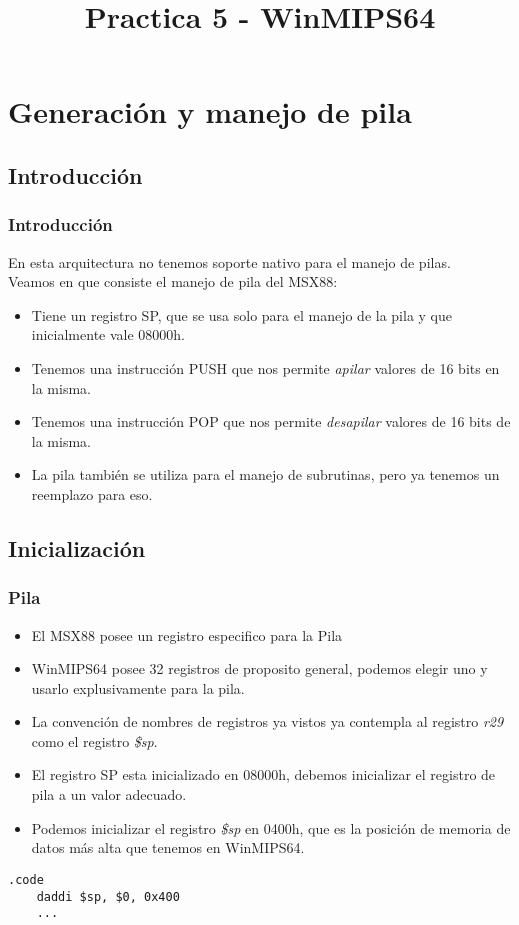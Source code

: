 \documentclass{beamer}
\title{Practica 5 - WinMIPS64}
\begin{document}
\section{Generación y manejo de pila}
\subsection{Introducción}
\begin{frame}
\frametitle{Introducción}
En esta arquitectura no tenemos soporte nativo para el manejo de pilas. \\
Veamos en que consiste el manejo de pila del MSX88:
\begin{itemize}
\item Tiene un registro SP, que se usa solo para el manejo de la pila y que inicialmente vale 08000h.
\item Tenemos una instrucción PUSH que nos permite \emph{apilar} valores de 16 bits en la misma.
\item Tenemos una instrucción POP que nos permite \emph{desapilar} valores de 16 bits de la misma.
\item La pila también se utiliza para el manejo de subrutinas, pero ya tenemos un reemplazo para eso.
\end{itemize}
\end{frame}

\subsection{Inicialización}
\begin{frame}[fragile]
\frametitle{Pila}
\begin{itemize}
\item El MSX88 posee un registro especifico para la Pila
\item WinMIPS64 posee 32 registros de proposito general, podemos elegir uno y usarlo explusivamente para la pila. 
\item La convención de nombres de registros ya vistos ya contempla al registro \emph{r29} como el registro \emph{\$sp}.
\item El registro SP esta inicializado en 08000h, debemos inicializar el registro de pila a un valor adecuado.
\item Podemos inicializar el registro \emph{\$sp} en 0400h, que es la posición de memoria de datos más alta que tenemos en WinMIPS64.
\end{itemize}

\begin{block}{}
\begin{lstlisting}[language=WinMIPS64,basicstyle=\ttfamily,keywordstyle=\color{blue}]
    .code
    daddi $sp, $0, 0x400
    ...
\end{lstlisting}
\end{block}

\end{frame}
\end{document}
